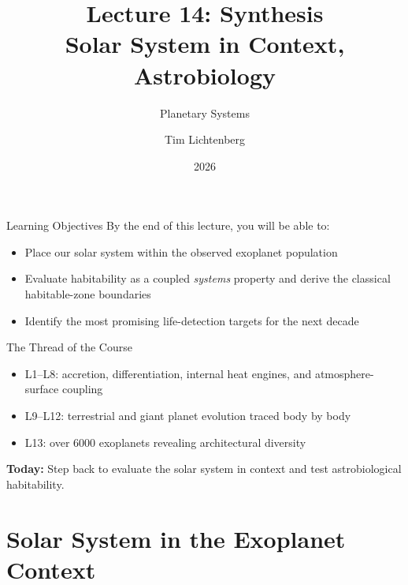 \documentclass[aspectratio=169, 11pt]{beamer}
\title[Lecture 14: Synthesis]{Lecture 14: Synthesis\\Solar System in Context, Astrobiology}
\subtitle{Planetary Systems}
\author[L14]{Tim Lichtenberg}
\institute{Kapteyn Astronomical Institute\\University of Groningen}
\date{2026}
\begin{document}
\begin{frame}
  \titlepage
\end{frame}

\begin{frame}{Learning Objectives}
  By the end of this lecture, you will be able to:
  \vskip8pt
  \begin{itemize}
    \item Place our solar system within the observed exoplanet population
    \item Evaluate habitability as a coupled \emph{systems} property and derive the classical habitable-zone boundaries
    \item Identify the most promising life-detection targets for the next decade
  \end{itemize}
  \vskip8pt
\end{frame}

\begin{frame}{The Thread of the Course}
  \begin{itemize}
    \item L1--L8: accretion, differentiation, internal heat engines, and atmosphere-surface coupling
    \item L9--L12: terrestrial and giant planet evolution traced body by body
    \item L13: over 6000 exoplanets revealing architectural diversity
  \end{itemize}
  \vskip8pt
  \textbf{Today:} Step back to evaluate the solar system in context and test astrobiological habitability.
\end{frame}

\begin{frame}
\end{frame}


\section{Solar System in the Exoplanet Context}
\end{document}
